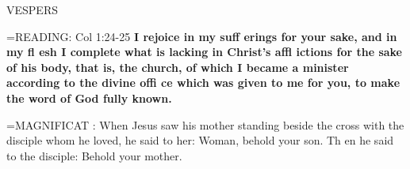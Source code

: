 \begin{flushleft}\normalsize VESPERS\\\end{flushleft}

\hangindent=\parindent \small{READING}: Col 1:24-25 \textbf{I rejoice in my suff erings for your sake, and in
my fl esh I complete what is lacking in Christ’s affl ictions for the
sake of his body, that is, the church, of which I became a minister
according to the divine offi ce which was given to me for you, to
make the word of God fully known.\\}
 
\hangindent=\parindent \small{MAGNIFICAT : When Jesus saw his mother standing beside the cross
with the disciple whom he loved, he said to her: Woman, behold
your son. Th en he said to the disciple: Behold your mother.\\}
 

